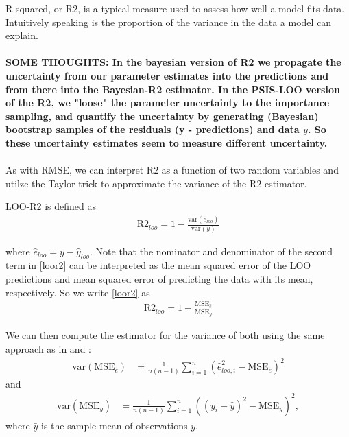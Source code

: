 \documentclass{article}
\begin{document}

R-squared, or R2, is a typical measure used to assess how well a model fits data. Intuitively speaking is the proportion of the variance in the data a model can explain. 
\\ \\
\textbf{SOME THOUGHTS: In the bayesian version of R2 we propagate the uncertainty from our parameter estimates into the predictions and from there into the Bayesian-R2 estimator. In the PSIS-LOO version of the R2, we "loose" the parameter uncertainty to the importance sampling, and quantify the uncertainty by generating (Bayesian) bootstrap samples of the residuals (y - predictions) and data $y$. So these uncertainty estimates seem to measure different uncertainty.}
\\ \\

As with RMSE, we can interpret R2 as a function of two random variables and utilze the Taylor trick to approximate the variance of the R2 estimator.

LOO-R2 is defined as
\begin{align}
\text{R2}_{loo} = 1 - \frac{\text{var}(\hat{e}_{loo}) }{ \text{var}(y)} \label{loor2}
\end{align}

where $\hat{e}_{loo} = y - \hat{y}_{loo}$. Note that the nominator and denominator of the second term in \eqref{loor2} can be interpreted as the mean squared error of the LOO predictions and mean squared error of predicting the data with its mean, respectively. So we write \eqref{loor2} as 
\begin{align}
    \text{R2}_{loo} = 1 - \frac{\text{MSE}_{\hat{e}} }{ \text{MSE}_y} \label{mser2}
\end{align}

We can then compute the estimator for the variance of both using the same approach as in \cite{sivula_uncertainty_2022} and \cite{vehtari_practical_2016}:
\begin{align}
    \text{var}(\text{MSE}_{\hat{e}}) &= \frac{1}{n (n-1)} \sum_{i = 1}^n \left( \hat{e}_{loo, i}^2 - \text{MSE}_{\hat{e}} \right)^2 \label{vare}
\end{align}
and
\begin{align}
    \text{var}(\text{MSE}_y) &= \frac{1}{n (n-1)} \sum_{i = 1}^n \left( (y_i - \hat{y})^2 -\text{MSE}_y \right)^2 \label{vary},
\end{align}
where $\bar{y}$ is the sample mean of observations $y$. 
\end{document}
